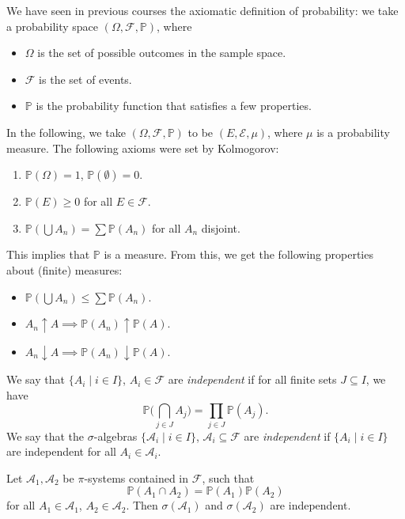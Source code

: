 \documentclass[12pt]{article}
\begin{document}
We have seen in previous courses the axiomatic definition of probability: we take a probability space $(\Omega, \mathcal{F}, \mathbb{P})$, where
\begin{itemize}
	\item $\Omega$ is the set of possible outcomes in the sample space.
	\item $\mathcal{F}$ is the set of events.
	\item $\mathbb{P}$ is the probability function that satisfies a few properties.
\end{itemize}
In the following, we take $(\Omega, \mathcal{F}, \mathbb{P})$ to be $(E, \mathcal{E}, \mu)$, where $\mu$ is a probability measure. The following axioms were set by Kolmogorov:
\begin{enumerate}
	\item $\mathbb{P}(\Omega) = 1$, $\mathbb{P}(\emptyset) = 0$.
	\item $\mathbb{P}(E) \geq 0$ for all $E \in \mathcal{F}$.
	\item $\mathbb{P}(\bigcup A_n) = \sum \mathbb{P}(A_n)$ for all $A_n$ disjoint.
\end{enumerate}
This implies that $\mathbb{P}$ is a measure. From this, we get the following properties about (finite) measures:
\begin{itemize}
	\item $\mathbb{P}(\bigcup A_n) \leq \sum \mathbb{P}(A_n)$.
	\item $A_n \uparrow A \implies \mathbb{P}(A_n) \uparrow \mathbb{P}(A)$.
	\item $A_n \downarrow A \implies \mathbb{P}(A_n) \downarrow \mathbb{P}(A)$.
\end{itemize}

\begin{definition}[Independence]
	We say that $\{A_i \mid i \in I\}$, $A_i \in \mathcal{F}$ are \emph{independent} if for all finite sets $J \subseteq I$, we have
	\[
	\mathbb{P}\Biggl( \bigcap_{j \in J} A_j \Biggr) = \prod_{j \in J} \mathbb{P}(A_j).
	\]
	We say that the $\sigma$-algebras $\{\mathcal{A}_i \mid i \in I\}$, $\mathcal{A}_i \subseteq \mathcal{F}$ are \emph{independent} if $\{A_i \mid i \in I\}$ are independent for all $A_i \in \mathcal{A}_i$.
\end{definition}

\begin{theorem}
	Let $\mathcal{A}_1, \mathcal{A}_2$ be $\pi$-systems contained in $\mathcal{F}$, such that
	\[
	\mathbb{P}(A_1 \cap A_2) = \mathbb{P}(A_1) \mathbb{P}(A_2)
	\]
	for all $A_1 \in \mathcal{A}_1$, $A_2 \in \mathcal{A}_2$. Then $\sigma(\mathcal{A}_1)$ and $\sigma(\mathcal{A}_2)$ are independent.
\end{theorem}
\end{document}
